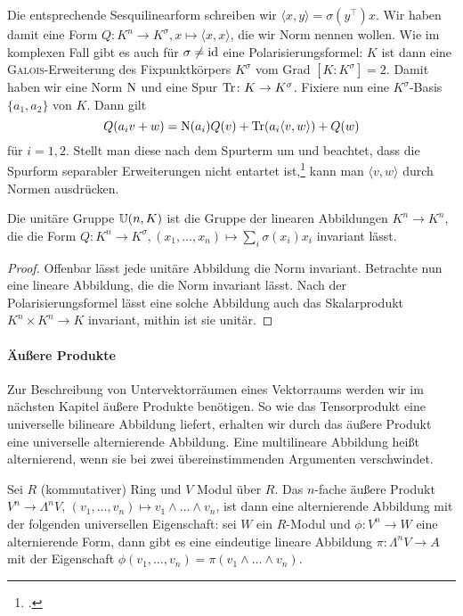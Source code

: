 Die entsprechende Sesquilinearform schreiben wir $\langle x, y \rangle = \sigma(y^\top) x$. Wir haben damit eine Form $Q \colon K^n \to K^\sigma, x \mapsto \langle x, x \rangle$, die wir Norm nennen wollen. Wie im komplexen Fall gibt es auch für $\sigma \neq \operatorname{id}$ eine Polarisierungsformel: $K$ ist dann eine \textsc{Galois}-Erweiterung des Fixpunktkörpers $K^\sigma$ vom Grad $[K:K^\sigma] = 2$. Damit haben wir eine Norm $\operatorname{N}$ und eine Spur $\operatorname{Tr} \colon K \rightarrow K^\sigma$. Fixiere nun eine $K^\sigma$-Basis $\{a_1, a_2\}$ von $K$. Dann gilt
\begin{equation*}
Q(a_i v + w) = \operatorname{N}(a_i) Q(v) + \operatorname{Tr}(a_i \langle v, w \rangle) + Q(w)
\end{equation*}
für $i = 1,2$. Stellt man diese nach dem Spurterm um und beachtet, dass die Spurform separabler Erweiterungen nicht entartet ist,\footcite[S.~199, Satz~7]{Bosch} kann man $\langle v, w \rangle$ durch Normen ausdrücken.
\begin{fact} \label{fact:norminv}
Die unitäre Gruppe $\mathbb U(n,K)$ ist die Gruppe der linearen Abbildungen $K^n \to K^n$, die die Form $Q \colon K^n \to K^\sigma, (x_1, \dots, x_n) \mapsto \sum_i \sigma(x_i) x_i$ invariant lässt.
\end{fact}
\begin{proof}
Offenbar lässt jede unitäre Abbildung die Norm invariant. Betrachte nun eine lineare Abbildung, die die Norm invariant lässt. Nach der Polarisierungsformel lässt eine solche Abbildung auch das Skalarprodukt $K^n \times K^n \to K$ invariant, mithin ist sie unitär.
\end{proof}

\paragraph{Äußere Produkte} Zur Beschreibung von Untervektorräumen eines Vektorraums werden wir im nächsten Kapitel äußere Produkte benötigen. So wie das Tensorprodukt eine universelle bilineare Abbildung liefert, erhalten wir durch das äußere Produkt eine universelle alternierende Abbildung. Eine multilineare Abbildung heißt alternierend, wenn sie bei zwei übereinstimmenden Argumenten verschwindet.

\begin{defin}
Sei $R$ (kommutativer) Ring und $V$ Modul über $R$. Das $n$-fache äußere Produkt $V^n \to \Lambda^n V$, $(v_1, \dots, v_n) \mapsto v_1 \wedge \dots \wedge v_n$, ist dann eine alternierende Abbildung mit der folgenden universellen Eigenschaft: sei $W$ ein $R$-Modul und $\phi \colon V^n \to W$ eine alternierende Form, dann gibt es eine eindeutige lineare Abbildung $\pi \colon \Lambda^n V \to A$ mit der Eigenschaft $\phi(v_1, \dots, v_n) = \pi(v_1 \wedge \dots \wedge v_n)$.
\end{defin}

